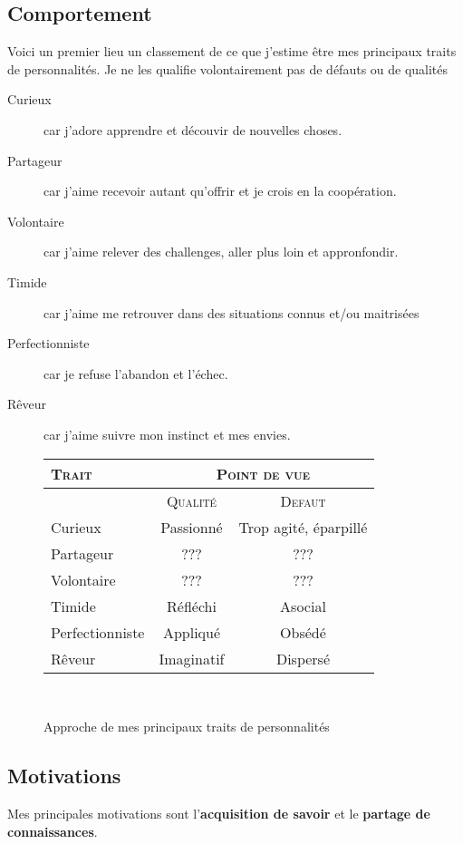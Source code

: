 \documentclass[a4paper,12pt, draft]{report}
\newcommand{\tabTitle}[1]{\hfill{} \textsc{#1} \hfill{} }
\begin{document}
\newpage
\subsection{Comportement}

Voici un premier lieu un classement de ce que j'estime être mes principaux traits de personnalités. Je ne les qualifie volontairement pas de défauts ou de qualités\\

\begin{description}
\item [Curieux]car j'adore apprendre et découvir de nouvelles choses.
\item [Partageur]car j'aime recevoir autant qu'offrir et je crois en la coopération.
\item [Volontaire]car j'aime relever des challenges, aller plus loin et appronfondir.
\item [Timide]car j'aime me retrouver dans des situations connus et/ou maitrisées
\item [Perfectionniste]car je refuse l'abandon et l'échec.
\item [Rêveur]car j'aime suivre mon instinct et mes envies.
\end{description}

\begin{figure}[h]
  \begin{tabular}{|l|c|c|}
    \hline

  \tabTitle{Trait} & \multicolumn{2}{c|}{\tabTitle{Point de vue}} \\
\hline
 & \tabTitle{Qualité} & \tabTitle{Defaut} \\
\hline
  Curieux & Passionné & Trop agité, éparpillé \\
  \hline
  Partageur & ??? & ???\\
  \hline
  Volontaire & ??? & ??? \\
  \hline
  Timide & Réfléchi & Asocial \\
  \hline
  Perfectionniste & Appliqué & Obsédé \\
  \hline
  Rêveur & Imaginatif & Dispersé \\
  \hline


    
  \end{tabular}\\
\caption{Approche de mes principaux traits de personnalités}
\end{figure}


\subsection{Motivations}
Mes principales motivations sont  l'\textbf{acquisition de savoir} et 
le \textbf{partage de connaissances}. 
\end{document}

